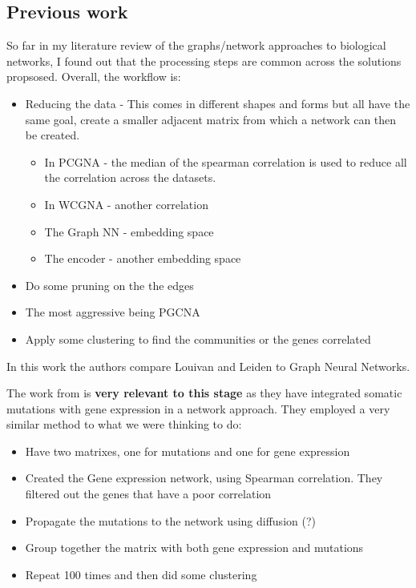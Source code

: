 \subsection{Previous work}

So far in my literature review of the graphs/network approaches to biological networks, I found out that the processing steps are common across the solutions propsosed. Overall, the workflow is:
\begin{itemize}
    \item Reducing the data - This comes in different shapes and forms but all have the same goal, create a smaller adjacent matrix from which a network can then be created.
    \begin{itemize}
        \item In PCGNA - the median of the spearman correlation is used to reduce all the correlation across the datasets.
        \item In WCGNA - another correlation
        \item The Graph NN - embedding space
        \item The encoder - another embedding space
    \end{itemize}
    \item Do some pruning on the the edges
    \item The most aggressive being PGCNA 
    \item Apply some clustering to find the communities or the genes correlated 
\end{itemize}


In this work the authors \cite{Sobolevsky2022-di} compare Louivan \cite{} and Leiden to Graph Neural Networks.



The work from \citet{He2017-dj} is \textbf{very relevant to this stage} as they have integrated somatic mutations with gene expression in a network approach.  They employed a very similar method to what we were thinking to do:
\begin{itemize}
    \item Have two matrixes, one for mutations and one for gene expression
    \item Created the Gene expression network, using Spearman correlation. They filtered out the genes that have a poor correlation
    \item Propagate the mutations to the network using diffusion (?)
    \item Group together the matrix with both gene expression and mutations
    \item Repeat 100 times and then did some clustering

\end{itemize}

